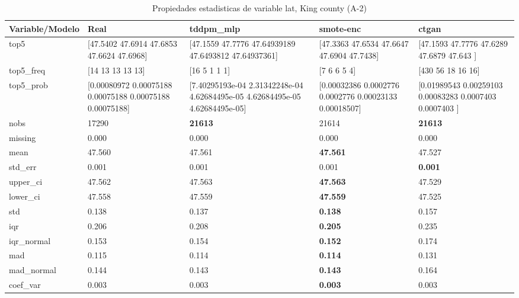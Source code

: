 \begin{table}[H]
\centering
\fontsize{8}{14}\selectfont
\caption{Propiedades  estadisticas de variable lat, King county (A-2)}
\label{table-stats-king county-a-2-lat}
\begin{tabular}{|l|m{10em}|m{10em}|m{10em}|m{10em}|}
\hline
 \rowcolor[gray]{0.8}
Variable/Modelo & Real & tddpm\_mlp & smote-enc & ctgan \\
\hline top5 & [47.5402 47.6914 47.6853 47.6624 47.6968] & [47.1559     47.7776     47.64939189 47.6493812  47.64937361] & [47.3363 47.6534 47.6647 47.6904 47.7438] & [47.1593 47.7776 47.6289 47.6879 47.643 ] \\
\hline top5\_freq & [14 13 13 13 13] & [16  5  1  1  1] & [7 6 6 5 4] & [430  56  18  16  16] \\
\hline top5\_prob & [0.00080972 0.00075188 0.00075188 0.00075188 0.00075188] & [7.40295193e-04 2.31342248e-04 4.62684495e-05 4.62684495e-05
 4.62684495e-05] & [0.00032386 0.0002776  0.0002776  0.00023133 0.00018507] & [0.01989543 0.00259103 0.00083283 0.0007403  0.0007403 ] \\
\hline nobs & 17290 & \bfseries 21613 & \cellcolor[rgb]{0.9, 0.54, 0.52} 21614 & \bfseries 21613 \\
\hline missing & 0.000 & 0.000 & 0.000 & 0.000 \\
\hline mean & 47.560 & 47.561 & \bfseries 47.561 & \cellcolor[rgb]{0.9, 0.54, 0.52} 47.527 \\
\hline std\_err & 0.001 & \cellcolor[rgb]{0.9, 0.54, 0.52} 0.001 & 0.001 & \bfseries 0.001 \\
\hline upper\_ci & 47.562 & 47.563 & \bfseries 47.563 & \cellcolor[rgb]{0.9, 0.54, 0.52} 47.529 \\
\hline lower\_ci & 47.558 & 47.559 & \bfseries 47.559 & \cellcolor[rgb]{0.9, 0.54, 0.52} 47.525 \\
\hline std & 0.138 & 0.137 & \bfseries 0.138 & \cellcolor[rgb]{0.9, 0.54, 0.52} 0.157 \\
\hline iqr & 0.206 & 0.208 & \bfseries 0.205 & \cellcolor[rgb]{0.9, 0.54, 0.52} 0.235 \\
\hline iqr\_normal & 0.153 & 0.154 & \bfseries 0.152 & \cellcolor[rgb]{0.9, 0.54, 0.52} 0.174 \\
\hline mad & 0.115 & 0.114 & \bfseries 0.114 & \cellcolor[rgb]{0.9, 0.54, 0.52} 0.131 \\
\hline mad\_normal & 0.144 & 0.143 & \bfseries 0.143 & \cellcolor[rgb]{0.9, 0.54, 0.52} 0.164 \\
\hline coef\_var & 0.003 & 0.003 & \bfseries 0.003 & \cellcolor[rgb]{0.9, 0.54, 0.52} 0.003 \\

\end{tabular}
\end{table}

